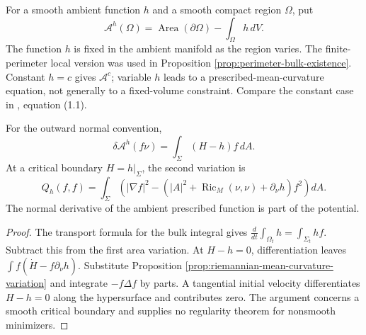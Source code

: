 \begin{definition}\label{def:prescribed-mean-curvature-energy}
For a smooth ambient function $h$ and a smooth compact region $\Omega$, put
\[
 \mathcal A^h(\Omega)=\operatorname{Area}(\partial\Omega)-\int_\Omega h\,dV.
\]
The function $h$ is fixed in the ambient manifold as the region varies. The finite-perimeter local version was used in Proposition \ref{prop:perimeter-bulk-existence}. Constant $h=c$ gives $\mathcal A^c$; variable $h$ leads to a prescribed-mean-curvature equation, not generally to a fixed-volume constraint. Compare the constant case in \cite{ZZCMC}, equation (1.1).
\end{definition}

\begin{proposition}\label{prop:prescribed-mean-curvature-variation}
For the outward normal convention,
\[
 \delta\mathcal A^h(f\nu)=\int_\Sigma(H-h)f\,dA.
\]
At a critical boundary $H=h|_\Sigma$, the second variation is
\[
 Q_h(f,f)=\int_\Sigma\left(|\nabla f|^2-
 (|A|^2+\operatorname{Ric}_M(\nu,\nu)+\partial_\nu h)f^2\right)dA.
\]
The normal derivative of the ambient prescribed function is part of the potential.
\end{proposition}
\begin{proof}
The transport formula for the bulk integral gives $\frac d{dt}\int_{\Omega_t}h=\int_{\Sigma_t}hf$. Subtract this from the first area variation. At $H-h=0$, differentiation leaves $\int f(\dot H-f\partial_\nu h)$. Substitute Proposition \ref{prop:riemannian-mean-curvature-variation} and integrate $-f\Delta f$ by parts. A tangential initial velocity differentiates $H-h=0$ along the hypersurface and contributes zero. The argument concerns a smooth critical boundary and supplies no regularity theorem for nonsmooth minimizers.
\end{proof}


